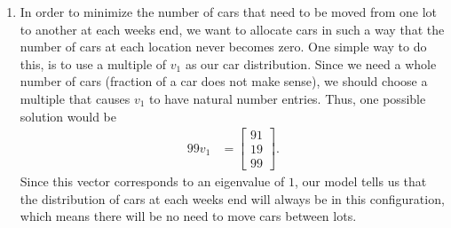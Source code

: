 \documentclass[10pt,a4paper]{article}
\theoremstyle{definition}
\begin{document}
\begin{enumerate}
\item In order to minimize the number of cars that need to be moved from one lot to another at each weeks end, we want to allocate cars in such a way that the number of cars at each location never becomes zero. One simple way to do this, is to use a multiple of $v_1$ as our car distribution. Since we need a whole number of cars (fraction of a car does not make sense), we should choose a multiple that causes $v_1$ to have natural number entries. Thus, one possible solution would be
\begin{align*}
99 v_1 &= \begin{bmatrix}
91\\
19\\
99
\end{bmatrix}.
\end{align*}
Since this vector corresponds to an eigenvalue of $1$, our model tells us that the distribution of cars at each weeks end will always be in this configuration, which means there will be no need to move cars between lots.
\end{enumerate}
\end{document}
